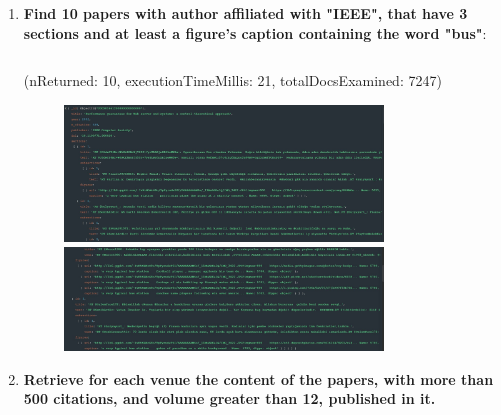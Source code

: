\documentclass{Configuration_Files/PoliMi3i_thesis}
\begin{document}
\begin{enumerate}
    \item \textbf{Find 10 papers with author affiliated with "IEEE", that have 3 sections and at least a figure's caption containing the word "bus"}:
    \inputminted[linenos,tabsize=2,breaklines]{MQL}{code/queries_mongodb/query_7.txt}
    (nReturned: 10, executionTimeMillis: 21, totalDocsExamined: 7247)
    \begin{figure}[H]
        \centering
        \includegraphics[width=0.8\textwidth]{Images/queries_mongodb/query_7_1.jpg}
        \includegraphics[width=0.8\textwidth]{Images/queries_mongodb/query_7_2.jpg}
    \end{figure}
    
    \pagebreak
    \item \textbf{Retrieve for each venue the content of the papers, with more than 500 citations, and volume greater than 12, published in it.}
    

\end{enumerate}
\end{document}
